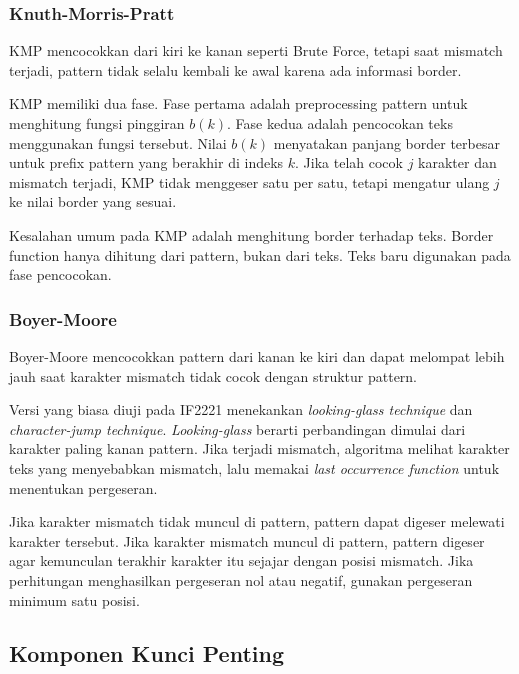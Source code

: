 \subsubsection{Knuth-Morris-Pratt}

\begin{jawab}
KMP mencocokkan dari kiri ke kanan seperti Brute Force, tetapi saat mismatch terjadi, pattern tidak selalu kembali ke awal karena ada informasi border.
\end{jawab}

KMP memiliki dua fase. Fase pertama adalah preprocessing pattern untuk menghitung fungsi pinggiran $b(k)$. Fase kedua adalah pencocokan teks menggunakan fungsi tersebut. Nilai $b(k)$ menyatakan panjang border terbesar untuk prefix pattern yang berakhir di indeks $k$. Jika telah cocok $j$ karakter dan mismatch terjadi, KMP tidak menggeser satu per satu, tetapi mengatur ulang $j$ ke nilai border yang sesuai.

Kesalahan umum pada KMP adalah menghitung border terhadap teks. Border function hanya dihitung dari pattern, bukan dari teks. Teks baru digunakan pada fase pencocokan.

\subsubsection{Boyer-Moore}

\begin{jawab}
Boyer-Moore mencocokkan pattern dari kanan ke kiri dan dapat melompat lebih jauh saat karakter mismatch tidak cocok dengan struktur pattern.
\end{jawab}

Versi yang biasa diuji pada IF2221 menekankan \textit{looking-glass technique} dan \textit{character-jump technique}. \textit{Looking-glass} berarti perbandingan dimulai dari karakter paling kanan pattern. Jika terjadi mismatch, algoritma melihat karakter teks yang menyebabkan mismatch, lalu memakai \textit{last occurrence function} untuk menentukan pergeseran.

Jika karakter mismatch tidak muncul di pattern, pattern dapat digeser melewati karakter tersebut. Jika karakter mismatch muncul di pattern, pattern digeser agar kemunculan terakhir karakter itu sejajar dengan posisi mismatch. Jika perhitungan menghasilkan pergeseran nol atau negatif, gunakan pergeseran minimum satu posisi.

\subsection{Komponen Kunci Penting}

